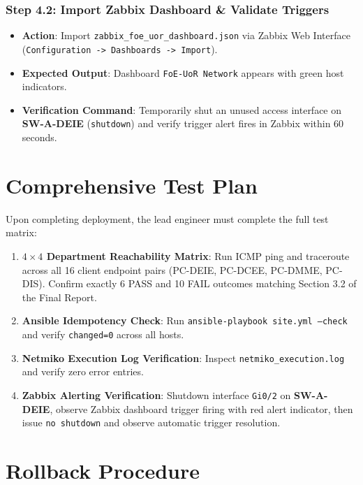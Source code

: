 \documentclass[11pt,a4paper]{article}
\newcommand{\hr}{\vspace{0.2cm}\noindent\hrulefill\vspace{0.2cm}}
\begin{document}
\subsubsection{Step 4.2: Import Zabbix Dashboard \& Validate Triggers}
\begin{itemize}
    \item \textbf{Action}: Import \texttt{zabbix\_foe\_uor\_dashboard.json} via Zabbix Web Interface (\texttt{Configuration -> Dashboards -> Import}).
    \item \textbf{Expected Output}: Dashboard \texttt{FoE-UoR Network} appears with green host indicators.
    \item \textbf{Verification Command}: Temporarily shut an unused access interface on \textbf{SW-A-DEIE} (\texttt{shutdown}) and verify trigger alert fires in Zabbix within 60 seconds.
\end{itemize}

\hr

\section{Comprehensive Test Plan}

Upon completing deployment, the lead engineer must complete the full test matrix:

\begin{enumerate}
    \item \textbf{\texorpdfstring{$4 \times 4$}{4x4} Department Reachability Matrix}: Run ICMP ping and traceroute across all 16 client endpoint pairs (PC-DEIE, PC-DCEE, PC-DMME, PC-DIS). Confirm exactly 6 PASS and 10 FAIL outcomes matching Section 3.2 of the Final Report.
    \item \textbf{Ansible Idempotency Check}: Run \texttt{ansible-playbook site.yml --check} and verify \texttt{changed=0} across all hosts.
    \item \textbf{Netmiko Execution Log Verification}: Inspect \texttt{netmiko\_execution.log} and verify zero error entries.
    \item \textbf{Zabbix Alerting Verification}: Shutdown interface \texttt{Gi0/2} on \textbf{SW-A-DEIE}, observe Zabbix dashboard trigger firing with red alert indicator, then issue \texttt{no shutdown} and observe automatic trigger resolution.
\end{enumerate}

\hr

\section{Rollback Procedure}
\end{document}
